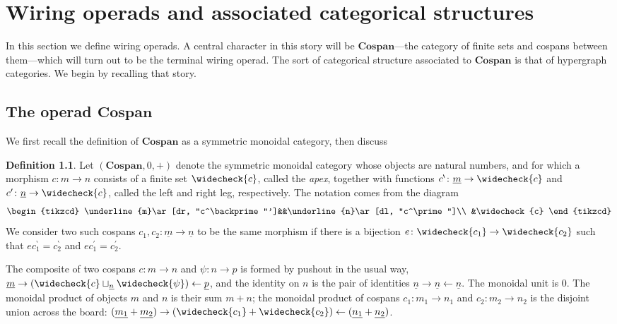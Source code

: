 \documentclass[11pt, article, oneside]{memoir}
\theoremstyle{plain}
\theoremstyle{definition}
\newtheorem{definition}[theorem]{Definition}
\theoremstyle{remark}
\newcommand{\Cat}[1]{\mathbf{#1}}
\newcommand{\from}{\leftarrow}
\newcommand{\ul}[1]{\underline{#1}}
\newcommand{\Cospan}{\Cat{Cospan}}
\newcommand{\lleg}[1]{#1^\backprime}
\newcommand{\rleg}[1]{#1^\prime}
\newcommand{\apex}[1]{\widecheck{#1}}
\newcommand{\cmap}{c}
\begin{document}
\chapter{Wiring operads and associated categorical structures}

In this section we define wiring operads. A central character in this story will be $\Cospan$---the category of finite sets and cospans between them---which will turn out to be the terminal wiring operad. The sort of categorical structure associated to $\Cospan$ is that of hypergraph categories. We begin by recalling that story.

\section{The operad $\Cospan$}

We first recall the definition of $\Cospan$ as a symmetric monoidal category, then discuss

\begin{definition}
Let $(\Cospan,0,+)$ denote the symmetric monoidal category whose objects are natural numbers, and for which a morphism $\cmap\colon m\to n$ consists of a finite set $\apex{\cmap}$, called the \emph{apex}, together with functions $\lleg\cmap\colon\ul{m}\to\apex{\cmap}$ and $\rleg\cmap\colon\ul{n}\to\apex{\cmap}$, called the left and right leg, respectively. The notation comes from the diagram
\[
\begin{tikzcd}
	\ul{m}\ar[dr, "\lleg\cmap"']&&\ul{n}\ar[dl, "\rleg\cmap"]\\
	&\apex{\cmap}
\end{tikzcd}
\]
We consider two such cospans $\cmap_1,\cmap_2\colon \ul{m}\to \ul{n}$ to be the same morphism if there is a bijection $e\colon\apex{\cmap_1}\to\apex{\cmap_2}$ such that $e\lleg\cmap_1=\lleg\cmap_2$ and $e\rleg\cmap_1=\rleg\cmap_2$.

The composite of two cospans $\cmap\colon m\to n$ and $\psi\colon n\to p$ is formed by pushout in the usual way, $\ul{m}\to(\apex{\cmap}\sqcup_{\ul{n}}\apex{\psi})\from\ul{p}$, and the identity on $n$ is the pair of identities $\ul{n}\to \ul{n}\from \ul{n}$. The monoidal unit is $0$. The monoidal product of objects $m$ and $n$ is their sum $m+n$; the monoidal product of cospans $\cmap_1\colon m_1\to n_1$ and $\cmap_2\colon m_2\to n_2$ is the disjoint union across the board: $(\ul{m_1}+\ul{m_2})\to(\apex{\cmap_1}+\apex{\cmap_2})\from (\ul{n_1}+\ul{n_2})$.
\end{definition}
\end{document}
